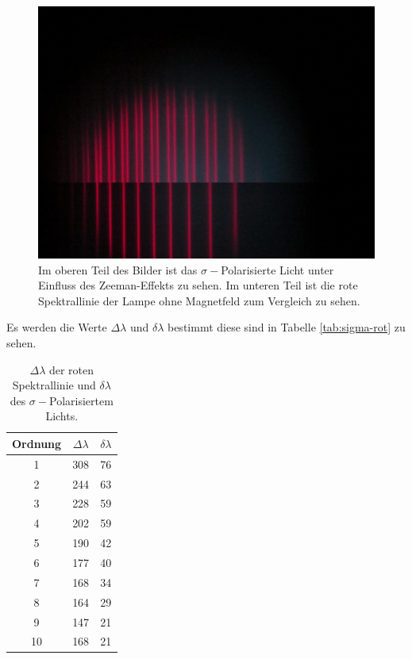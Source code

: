 \begin{figure}
    \centering
    \includegraphics[width=\textwidth]{content/data/Rot_0_sigma_uebernander.JPG}
    \caption{Im oberen Teil des Bilder ist das $\sigma -$Polarisierte Licht unter Einfluss des Zeeman-Effekts zu sehen. Im unteren Teil ist die rote Spektrallinie der Lampe ohne Magnetfeld zum Vergleich zu sehen.}
    \label{fig:rot-sigma}
\end{figure}

Es werden die Werte $\Delta \lambda$ und $\delta \lambda$ bestimmt diese sind in Tabelle \autoref{tab:sigma-rot} zu sehen.

\begin{table}
    \centering
    \caption{$\Delta \lambda$ der roten Spektrallinie und $\delta \lambda$ des $\sigma -$Polarisiertem Lichts.}
    \begin{tabular}{ccc}
        \toprule
        Ordnung & $\Delta \lambda$ & $\delta \lambda $  \\
        \midrule
        1   &   308  &    76    \\
        2   &   244  &    63    \\
        3   &   228  &    59    \\
        4   &   202  &    59    \\
        5   &   190  &    42    \\
        6   &   177  &    40    \\
        7   &   168  &    34    \\
        8   &   164  &    29    \\
        9   &   147  &    21    \\
        10  &   168  &    21    \\
        \bottomrule
    \end{tabular}
    \label{tab:sigma-rot}
\end{table}

